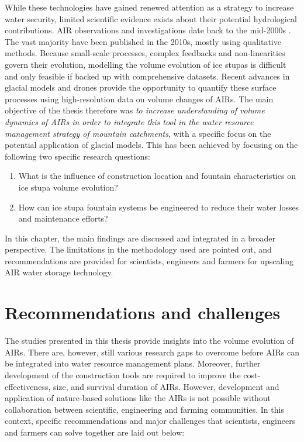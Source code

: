 While these technologies have gained renewed attention as a strategy to increase water security, limited
scientific evidence exists about their potential hydrological contributions. AIR observations and investigations
date back to the mid-2000s \citep{tveitenGlacierGrowingLocal2007}. The vast majority have been published in the
2010s, mostly using qualitative methods. Because small-scale processes, complex feedbacks and non-linearities
govern their evolution, modelling the volume evolution of ice stupas is difficult and only feasible if backed up
with comprehensive datasets. Recent advances in glacial models and drones provide the opportunity to quantify
these surface processes using high-resolution data on volume changes of \ac{AIRs}. The main objective of the
thesis therefore was \textit{to increase understanding of volume dynamics of \ac{AIRs} in order to integrate
this tool in the water resource management strategy of mountain catchments}, with a specific focus on the
potential application of glacial models. This has been achieved by focusing on the following two specific
research questions:

\begin{enumerate}
  \item{What is the influence of construction location and fountain characteristics on ice stupa volume
    evolution?}
  \item{How can ice stupa fountain systems be engineered to reduce their water losses and maintenance efforts?}
\end{enumerate}

In this chapter, the main findings are discussed and integrated in a broader perspective. The limitations in the
methodology used are pointed out, and recommendations are provided for scientists, engineers and farmers for
upscaling AIR water storage technology.

\section{Recommendations and challenges}

The studies presented in this thesis provide insights into the volume evolution of \ac{AIRs}. There are,
however, still various research gaps to overcome before \ac{AIRs} can be integrated into water resource
management plans. Moreover, further development of the construction tools are required to improve the
cost-effectiveness, size, and survival duration of \ac{AIRs}. However, development and application of
nature-based solutions like the \ac{AIRs} is not possible without collaboration between scientific, engineering
and farming communities. In this context, specific recommendations and major challenges that scientists,
engineers and farmers can solve together are laid out below:

